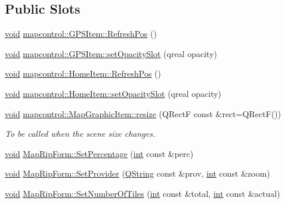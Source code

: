 \subsection*{Public Slots}
\begin{DoxyCompactItemize}
\item 
\hyperlink{group___u_a_v_objects_plugin_ga444cf2ff3f0ecbe028adce838d373f5c}{void} \hyperlink{group___o_p_map_widget_gab998fe4c6c60b16ae2caceafa1f08edc}{mapcontrol\-::\-G\-P\-S\-Item\-::\-Refresh\-Pos} ()
\item 
\hyperlink{group___u_a_v_objects_plugin_ga444cf2ff3f0ecbe028adce838d373f5c}{void} \hyperlink{group___o_p_map_widget_ga877e61b6ded2fb2da63d23538e7bb089}{mapcontrol\-::\-G\-P\-S\-Item\-::set\-Opacity\-Slot} (qreal opacity)
\item 
\hyperlink{group___u_a_v_objects_plugin_ga444cf2ff3f0ecbe028adce838d373f5c}{void} \hyperlink{group___o_p_map_widget_ga1c60e950a733d8e38796cfe092fb4154}{mapcontrol\-::\-Home\-Item\-::\-Refresh\-Pos} ()
\item 
\hyperlink{group___u_a_v_objects_plugin_ga444cf2ff3f0ecbe028adce838d373f5c}{void} \hyperlink{group___o_p_map_widget_ga47780346c1ba4c4076c12ea2555a1d8e}{mapcontrol\-::\-Home\-Item\-::set\-Opacity\-Slot} (qreal opacity)
\item 
\hyperlink{group___u_a_v_objects_plugin_ga444cf2ff3f0ecbe028adce838d373f5c}{void} \hyperlink{group___o_p_map_widget_ga717dc7dc9953d7242b9f0db9d2e3951e}{mapcontrol\-::\-Map\-Graphic\-Item\-::resize} (Q\-Rect\-F const \&rect=Q\-Rect\-F())
\begin{DoxyCompactList}\small\item\em To be called when the scene size changes. \end{DoxyCompactList}\item 
\hyperlink{group___u_a_v_objects_plugin_ga444cf2ff3f0ecbe028adce838d373f5c}{void} \hyperlink{group___o_p_map_widget_gae4b3b2cf5a261ca12edc1e1f092f7790}{Map\-Rip\-Form\-::\-Set\-Percentage} (\hyperlink{ioapi_8h_a787fa3cf048117ba7123753c1e74fcd6}{int} const \&perc)
\item 
\hyperlink{group___u_a_v_objects_plugin_ga444cf2ff3f0ecbe028adce838d373f5c}{void} \hyperlink{group___o_p_map_widget_gabf71ea1f21a81271ca9487530d7c9b23}{Map\-Rip\-Form\-::\-Set\-Provider} (\hyperlink{group___u_a_v_objects_plugin_gab9d252f49c333c94a72f97ce3105a32d}{Q\-String} const \&prov, \hyperlink{ioapi_8h_a787fa3cf048117ba7123753c1e74fcd6}{int} const \&zoom)
\item 
\hyperlink{group___u_a_v_objects_plugin_ga444cf2ff3f0ecbe028adce838d373f5c}{void} \hyperlink{group___o_p_map_widget_ga7f74961ce862f3c6173a9634b3de2e53}{Map\-Rip\-Form\-::\-Set\-Number\-Of\-Tiles} (\hyperlink{ioapi_8h_a787fa3cf048117ba7123753c1e74fcd6}{int} const \&total, \hyperlink{ioapi_8h_a787fa3cf048117ba7123753c1e74fcd6}{int} const \&actual)

\end{DoxyCompactItemize}
